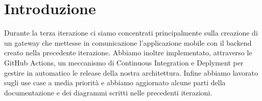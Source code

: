 \section{Introduzione}
Durante la terza iterazione ci siamo concentrati principalmente sulla creazione di un gateway che mettesse in comunicazione l'applicazione mobile con il backend creato nella precedente iterazione.
Abbiamo inoltre implementato, attraverso le GitHub Actions, un meccanismo di Continuous Integration e Deplyment per gestire in automatico le release della nostra architettura.
Infine abbiamo lavorato sugli use case a media priorità e abbiamo aggiornato alcune parti della documentazione e dei diagrammi scritti nelle precedenti iterazioni.